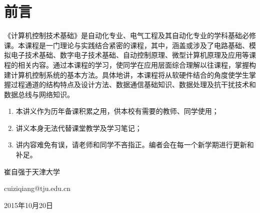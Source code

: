 \thispagestyle{empty}
\chapter{前言}


《计算机控制技术基础》是自动化专业、电气工程及其自动化专业的学科基础必修课。本课程是一门理论与实践结合紧密的课程，其中，涵盖或涉及了电路基础、模拟电子技术基础、数字电子技术基础、自动控制原理、微型计算机原理及应用等课程的相关内容。通过本课程的学习，使同学在应用层面综合理解以往课程，掌握构建计算机控制系统的基本方法。具体地讲，本课程将从软硬件结合的角度使学生掌握过程通道的结构特点及设计方法、数据通信基础知识、数据处理及抗干扰技术和数据总线与网络知识。


\begin{enumerate}
  \item 本讲义作为历年备课积累之用，供本校有需要的教师、同学使用；
  \item 讲义本身无法代替课堂教学及学习笔记；
  \item 讲内容难免有误，请老师和同学不吝指正。编者会在每一个新学期进行更新和补足。
\end{enumerate}





\begin{flushright}
崔自强于天津大学

cuiziqiang@tju.edu.cn

2015年10月20日
\end{flushright}

